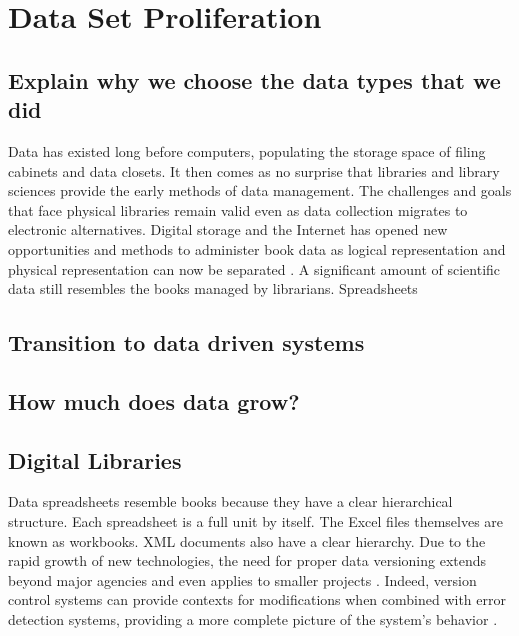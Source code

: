 \section{Data Set Proliferation}

\subsection{Explain why we choose the data types that we did}
Data has existed long before computers, populating the storage space of filing cabinets and data closets.
It then comes as no surprise that libraries and library sciences provide the early methods of data management.
The challenges and goals that face physical libraries remain valid even as data collection migrates to electronic alternatives.
Digital storage and the Internet has opened new opportunities and methods to administer book data as logical representation and physical representation can now be separated \cite{Barkstrom_digitallibrary}.
A significant amount of scientific data still resembles the books managed by librarians.
Spreadsheets 

\subsection{Transition to data driven systems}

\subsection{How much does data grow?}

\subsection{Digital Libraries}
Data spreadsheets resemble books because they have a clear hierarchical structure.
Each spreadsheet is a full unit by itself.  The Excel files themselves are known as workbooks.
XML documents also have a clear hierarchy.
Due to the rapid growth of new technologies, the need for proper data versioning extends beyond major agencies and even applies to smaller projects \cite{burrows2006review} \cite{Tagger2005} \cite{Stuckenholz:2005:CEV:1039174.1039197}.
Indeed, version control systems can provide contexts for modifications when combined with error detection systems, providing a more complete picture of the system's behavior \cite{Fischer2003}.

